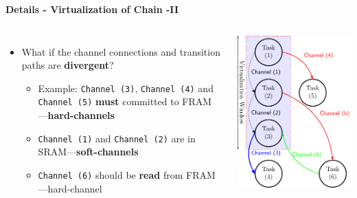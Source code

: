 

\begin{frame}{\textbf{Details - Virtualization of Chain -II}}
	
	\begin{columns}		
		
		\begin{itemize}
			\item What if the channel connections and transition paths are \textbf{divergent}? 
			\begin{itemize}
				\item Example: \texttt{Channel (3)}, \texttt{Channel (4)} and \texttt{Channel (5)} \textbf{must} committed to FRAM ---\textbf{hard-channels}
				\item \texttt{Channel (1)} and \texttt{Channel (2)} are in SRAM---\textbf{soft-channels}
				\item \texttt{Channel (6)} should be \textbf{read} from FRAM---hard-channel
			\end{itemize}
		\end{itemize}
		
		\includegraphics[scale=0.50]{images/chain-virtualization-II.pdf}
	\end{columns}	
	

\end{frame}
